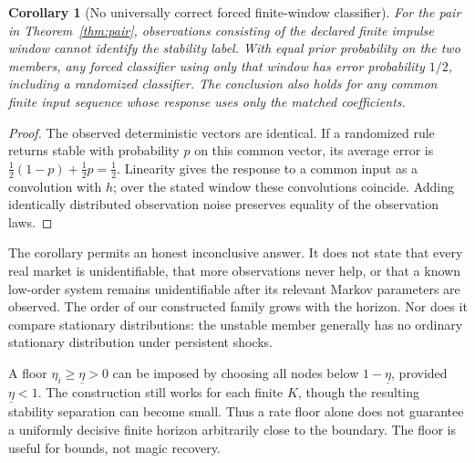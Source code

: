 \documentclass[11pt]{article}
\newtheorem{corollary}[theorem]{Corollary}
\theoremstyle{remark}\newtheorem{remark}[theorem]{Remark}
\newcommand{\floorate}{\underline\eta}
\begin{document}
\begin{corollary}[No universally correct forced finite-window classifier]\label{cor:class}
For the pair in Theorem~\ref{thm:pair}, observations consisting of the declared finite impulse window cannot identify the stability label. With equal prior probability on the two members, any forced classifier using only that window has error probability $1/2$, including a randomized classifier. The conclusion also holds for any common finite input sequence whose response uses only the matched coefficients.
\end{corollary}
\begin{proof}
The observed deterministic vectors are identical. If a randomized rule returns stable with probability $p$ on this common vector, its average error is $\tfrac12(1-p)+\tfrac12p=\tfrac12$. Linearity gives the response to a common input as a convolution with $h$; over the stated window these convolutions coincide. Adding identically distributed observation noise preserves equality of the observation laws.
\end{proof}

The corollary permits an honest inconclusive answer. It does not state that every real market is unidentifiable, that more observations never help, or that a known low-order system remains unidentifiable after its relevant Markov parameters are observed. The order of our constructed family grows with the horizon. Nor does it compare stationary distributions: the unstable member generally has no ordinary stationary distribution under persistent shocks.

A floor $\eta_i\ge\floorate>0$ can be imposed by choosing all nodes below $1-\floorate$, provided $\floorate<1$. The construction still works for each finite $K$, though the resulting stability separation can become small. Thus a rate floor alone does not guarantee a uniformly decisive finite horizon arbitrarily close to the boundary. The floor is useful for bounds, not magic recovery.
\end{document}
